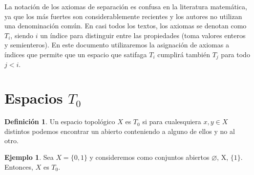 \documentclass[12pt,twoside]{report}
\theoremstyle{azul}
\theoremstyle{azul2}
\theoremstyle{plain}
\theoremstyle{definition}
\newtheorem*{eje}{Ejemplo}
\newtheorem*{defi}{Definición}
\theoremstyle{remark}
\begin{document}
La notación de los axiomas de separación es confusa en la literatura matemática, ya que los más fuertes son considerablemente recientes y los autores no utilizan una denominación común. En casi todos los textos, los axiomas se denotan como $T_i$, siendo $i$ un índice para distinguir entre las propiedades (toma valores enteros y semienteros). En este documento utilizaremos la asignación de axiomas a índices que permite que un espacio que satifaga $T_i$ cumplirá también $T_j$ para todo $j<i$. \raggedright


\section{Espacios $T_0$}\label{espt0}

\begin{defi}
Un espacio topológico $X$ es $T_0$ si para cualesquiera $x, y \in X$ distintos podemos encontrar un abierto conteniendo a alguno de ellos y no al otro.
\end{defi}

\begin{eje}
Sea $X=\{0,1\}$ y consideremos como conjuntos abiertos $\varnothing$, X, $\{1\}$. Entonces, $X$ es $T_0$.
\end{eje}
\end{document}
